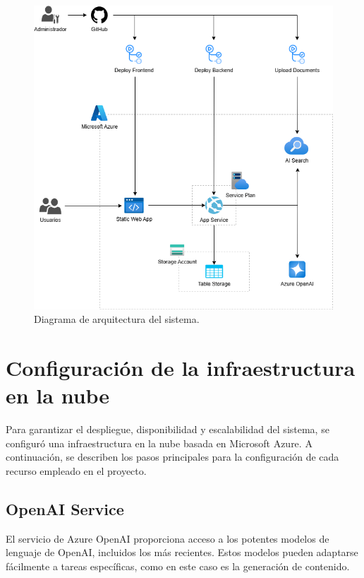 \vspace{30mm}

\begin{figure}[ht]
	\centering
	\includegraphics[scale=.55]{./Figures/arquitectura.png}
	\caption{Diagrama de arquitectura del sistema.}
	\label{fig:architecture}
\end{figure}

\vspace{8mm}

\section{Configuración de la infraestructura en la nube}

Para garantizar el despliegue, disponibilidad y escalabilidad del sistema, se configuró una infraestructura en la nube basada en Microsoft Azure. 
A continuación, se describen los pasos principales para la configuración de cada recurso empleado en el proyecto.

\subsection{OpenAI Service}

El servicio de Azure OpenAI proporciona acceso a los potentes modelos de lenguaje de OpenAI, incluidos los más recientes. 
Estos modelos pueden adaptarse fácilmente a tareas específicas, como en este caso es la generación de contenido.

